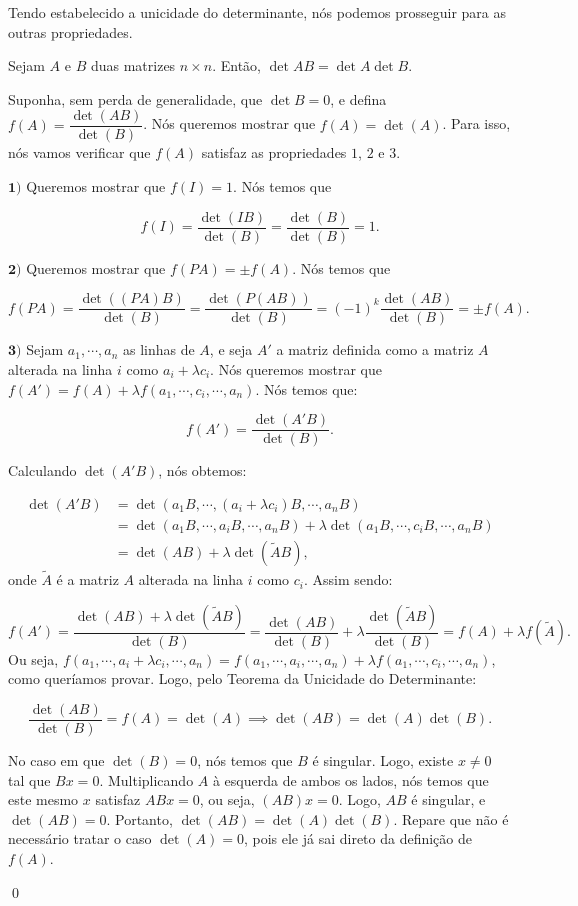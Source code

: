 Tendo estabelecido a unicidade do determinante, nós podemos prosseguir para as outras propriedades.

\begin{Proposition}
	Sejam $A$ e $B$ duas matrizes $n\times n$. Então, $\det AB = \det A\det B$.
\end{Proposition}

\begin{Proof}
	Suponha, sem perda de generalidade, que $\det B = 0$, e defina $f(A) =\dfrac{\det(AB)}{\det(B)}$. Nós queremos mostrar que $f(A) = \det(A)$. Para isso, nós vamos verificar que $f(A)$ satisfaz as propriedades $1$, $2$ e $3$.
	
	$\mathbf{1)}$ Queremos mostrar que $f(I) = 1$. Nós temos que
	
	$$
	f(I) = \dfrac{\det(IB)}{\det(B)} = \dfrac{\det(B)}{\det(B)} = 1.
	$$
	
	$\mathbf{2)}$ Queremos mostrar que $f(PA) = \pm f(A)$. Nós temos que
	
	$$
	f(PA) = \dfrac{\det((PA)B)}{\det(B)} = \dfrac{\det(P(AB))}{\det(B)} = (-1)^k\dfrac{\det(AB)}{\det(B)} = \pm f(A).
	$$
	
	$\mathbf{3)}$ Sejam $a_1, \cdots, a_n$ as linhas de $A$, e seja $A'$ a matriz definida como a matriz $A$ alterada na linha $i$ como $a_i + \lambda c_i$. Nós queremos mostrar que $f(A') = f(A) + \lambda f(a_1, \cdots, c_i, \cdots, a_n)$. Nós temos que:
	
	$$
	f(A') = \dfrac{\det(A'B)}{\det(B)}.
	$$
	
	Calculando $\det(A'B)$, nós obtemos:
	
	\begin{align*}
		\det(A'B) &= \det(a_1B, \cdots, (a_i + \lambda c_i)B, \cdots, a_nB) \\ &= \det(a_1B, \cdots, a_iB, \cdots, a_nB) + \lambda\det(a_1B, \cdots, c_iB, \cdots, a_nB) \\ &= \det(AB) + \lambda\det(\tilde{A}B),
	\end{align*}
	onde $\tilde{A}$ é a matriz $A$ alterada na linha $i$ como $c_i$. Assim sendo:
	
	$$
	f(A') = \dfrac{\det(AB) + \lambda\det(\tilde{A}B)}{\det(B)} = \dfrac{\det(AB)}{\det(B)} + \lambda\dfrac{\det(\tilde{A}B)}{\det(B)} = f(A) + \lambda f(\tilde{A}).
	$$
	Ou seja, $f(a_1, \cdots, a_i + \lambda c_i, \cdots, a_n) = f(a_1, \cdots, a_i, \cdots, a_n) + \lambda f(a_1, \cdots, c_i, \cdots, a_n)$, como queríamos provar. Logo, pelo Teorema da Unicidade do Determinante:
	
	$$
	\dfrac{\det(AB)}{\det(B)} = f(A) = \det(A)\implies \det(AB) = \det(A)\det(B).
	$$
	
	No caso em que $\det(B) = 0$, nós temos que $B$ é singular. Logo, existe $x\neq 0$ tal que $Bx = 0$. Multiplicando $A$ à esquerda de ambos os lados, nós temos que este mesmo $x$ satisfaz $ABx = 0$, ou seja, $(AB)x = 0$. Logo, $AB$ é singular, e $\det(AB) = 0$. Portanto, $\det(AB) = \det(A)\det(B)$. Repare que não é necessário tratar o caso $\det(A) = 0$, pois ele já sai direto da definição de $f(A)$.
	
	\qed
\end{Proof}

